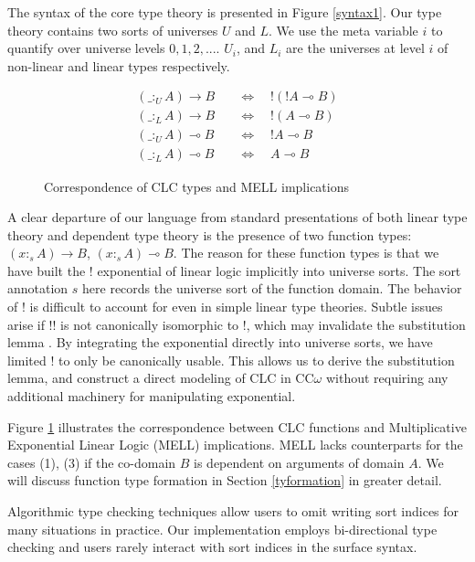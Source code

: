 \documentclass[sigplan,screen,review,anonymous]{acmart}
\newcommand{\utype}{:_{\scriptscriptstyle U}}
\newcommand{\ltype}{:_{\scriptscriptstyle L}}
\begin{document}
The syntax of the core type theory is presented in Figure \ref{syntax1}. Our type theory contains two sorts of universes $U$ and $L$. We use the meta variable $i$ to quantify over universe levels $0, 1, 2, ...$. $U_i$, and $L_i$ are the universes at level $i$ of non-linear and linear types respectively.
\begin{figure}[h]
  \caption{Correspondence of CLC types and MELL implications}
  \Description{}
  \begin{align}
    (\_ \utype A) \rightarrow B \quad & \Leftrightarrow \quad !(!A \multimap B) \\
    (\_ \ltype A) \rightarrow B \quad & \Leftrightarrow \quad !(A \multimap B)  \\
    (\_ \utype A) \multimap B \quad   & \Leftrightarrow \quad !A \multimap B    \\
    (\_ \ltype A) \multimap B \quad   & \Leftrightarrow \quad A \multimap B
  \end{align}
  \label{correspondence}
\end{figure}

A clear departure of our language from standard presentations of both linear type theory and dependent type theory is the presence of two function types: $(x :_s A) \rightarrow B$, $(x :_s A) \multimap B$. The reason for these function types is that we have built the ! exponential of linear logic implicitly into universe sorts. The sort annotation $s$ here records the universe sort of the function domain. The behavior of ! is difficult to account for even in simple linear type theories. Subtle issues arise if !! is not canonically isomorphic to !, which may invalidate the substitution lemma \cite{substitute}. By integrating the exponential directly into universe sorts, we have limited ! to only be canonically usable. This allows us to derive the substitution lemma, and construct a direct modeling of CLC in CC$\omega$ without requiring any additional machinery for manipulating exponential.

Figure \ref{correspondence} illustrates the correspondence between CLC functions and Multiplicative Exponential Linear Logic (MELL) implications. MELL lacks counterparts for the cases (1), (3) if the co-domain $B$ is dependent on arguments of domain $A$. We will discuss function type formation in Section \ref{tyformation} in greater detail.

Algorithmic type checking techniques allow users to omit writing sort indices for many situations in practice. Our implementation employs bi-directional type checking and users rarely interact with sort indices in the surface syntax.
\end{document}
